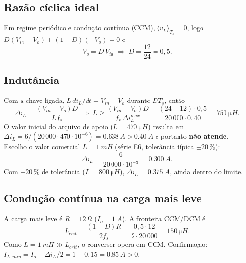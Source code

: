 \documentclass[11pt,a4paper]{article}
\newcommand{\fs}{f_s}
\newcommand{\Vin}{V_{in}}
\newcommand{\Vo}{V_o}
\newcommand{\dIL}{\Delta i_L}
\begin{document}
\subsection{Raz\~ao c\'iclica ideal}
Em regime peri\'odico e condu\c{c}\~ao cont\'inua (CCM), $\langle v_L\rangle_{T_s}=0$, logo $D(\Vin-\Vo)+(1-D)(-\Vo)=0$ e
\begin{equation}
 \Vo = D\,\Vin \;\Rightarrow\; D=\frac{12}{24}=0{,}5 .
\end{equation}

\subsection{Indut\^ancia}
Com a chave ligada, $L\,di_L/dt=\Vin-\Vo$ durante $DT_s$, ent\~ao
\begin{equation}
 \dIL=\frac{(\Vin-\Vo)D}{L\fs}\;\Rightarrow\; L\ge\frac{(\Vin-\Vo)D}{\fs\,\dIL^{max}}
 =\frac{(24-12)\cdot0{,}5}{20\,000\cdot0{,}40}=\SI{750}{\micro H}.
\end{equation}
O valor inicial do arquivo de apoio ($L=\SI{470}{\micro H}$) resulta em $\dIL=6/(20\,000\cdot470\cdot10^{-6})=\SI{0,638}{A}>\SI{0,40}{A}$ e portanto \textbf{n\~ao atende}. Escolho o valor comercial $L=\SI{1}{mH}$ (s\'erie E6, toler\^ancia t\'ipica $\pm20\,\%$):
\begin{equation}
 \dIL=\frac{6}{20\,000\cdot10^{-3}}=\SI{0,300}{A}.
\end{equation}
Com $-20\,\%$ de toler\^ancia ($L=\SI{800}{\micro H}$), $\dIL=\SI{0,375}{A}$, ainda dentro do limite.

\subsection{Condu\c{c}\~ao cont\'inua na carga mais leve}
A carga mais leve \'e $R=\SI{12}{\ohm}$ ($I_o=\SI{1}{A}$). A fronteira CCM/DCM \'e
\begin{equation}
 L_{crit}=\frac{(1-D)R}{2\fs}=\frac{0{,}5\cdot12}{2\cdot20\,000}=\SI{150}{\micro H}.
\end{equation}
Como $L=\SI{1}{mH}\gg L_{crit}$, o conversor opera em CCM. Confirma\c{c}\~ao: $I_{L,min}=I_o-\dIL/2=1-0{,}15=\SI{0,85}{A}>0$.
\end{document}
